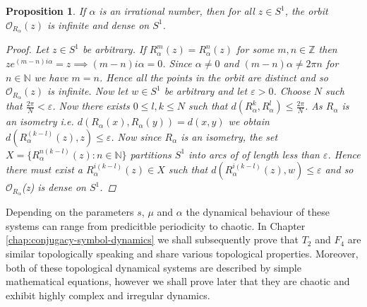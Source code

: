\documentclass[11pt,a4paper,oneside]{memoir}
\theoremstyle{plain}
\newtheorem{prop}[thm]{Proposition}
\theoremstyle{definition}
\begin{document}
\begin{prop} \label{prop:rigid-rotations-irrational}
    If $\alpha$ is an irrational number, then for all $z \in S^1$, the orbit $\mathcal{O}_{R_\alpha}(z)$ is infinite and dense on $S^1$.
    \begin{proof}
        Let $z \in S^1$ be arbitrary. If $R_\alpha^m(z) = R_\alpha^n(z)$ for some $m, n \in \mathbb{Z}$ then $ze^{(m-n)i\alpha} = z \implies (m - n)i\alpha = 0$. Since $\alpha \neq 0$ and $(m - n)\alpha \neq 2\pi n$ for $n \in \mathbb{N}$ we have $m = n$. Hence all the points in the orbit are distinct and so $\mathcal{O}_{R_\alpha}(z)$ is infinite. Now let $w \in S^1$ be arbitrary and let $\varepsilon > 0$. Choose $N$ such that $\frac{2\pi}{N} < \varepsilon$. Now there exists $0 \leq l, k \leq N$ such that $d\left( R_\alpha^k, R_\alpha^l \right) \leq \frac{2\pi}{N}$. As $R_\alpha$ is an isometry i.e. $d(R_\alpha(x), R_\alpha(y)) = d(x, y)$ we obtain $d(R_\alpha^{(k - l)}(z), z) \leq \varepsilon$. Now since $R_\alpha$ is an isometry, the set $X = \lbrace R_\alpha^{n(k - l)}(z) : n \in \mathbb{N} \rbrace$ partitions $S^1$ into arcs of of length less than $\varepsilon$. Hence there must exist a $R_\alpha^{i(k - l)}(z) \in X$ such that $d(R_\alpha^{i(k - l)}(z), w) \leq \varepsilon$ and so $\mathcal{O}_{R_{\alpha}}$(z) is dense on $S^1$.
    \end{proof}
\end{prop}

Depending on the parameters $s$, $\mu$ and $\alpha$ the dynamical behaviour of these systems can range from predicitble periodicity to chaotic. In Chapter \ref{chap:conjugacy-symbol-dynamics} we shall subsequently prove that $T_2$ and $F_4$ are similar topologically speaking and share various topological properties. Moreover, both of these topological dynamical systems are described by simple mathematical equations, however we shall prove later that they are chaotic and exhibit highly complex and irregular dynamics.
\end{document}
